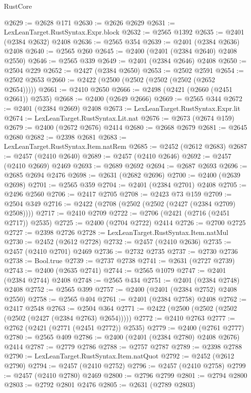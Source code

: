 \begin{lexlean}{RustCore}
\begin{coremodule}
@2629 := @2628 @171
@2630 := @2626 @2629
@2631 := LexLeanTarget.RustSyntax.Expr.block
@2632 := @2565 @1392
@2635 := @2401 (@2384 @2632) @2408
@2636 := @2565 @354
@2639 := @2401 (@2384 @2636) @2408
@2640 := @2565 @260
@2645 := @2400 (@2401 (@2384 @2640) @2408 @2550)
@2646 := @2565 @339
@2649 := @2401 (@2384 @2646) @2408
@2650 := @2504 @229
@2652 := @2427 (@2384 @2650)
@2653 := @2502 @2591
@2654 := @2502 @2653
@2660 := @2422 (@2500 (@2502 (@2502 (@2502 (@2652 @2654)))))
@2661 := @2410 @2650
@2666 := @2498 (@2421 (@2660 (@2451 @2661)) @2535)
@2668 := @2400 (@2649 @2666)
@2669 := @2565 @344
@2672 := @2401 (@2384 @2669) @2408
@2673 := LexLeanTarget.RustSyntax.Expr.lit
@2674 := LexLeanTarget.RustSyntax.Lit.nat
@2676 := @2673 (@2674 @159)
@2679 := @2400 (@2672 @2676) @2414
@2680 := @2668 @2679
@2681 := @2645 @2680
@2682 := @2398 @2681
@2683 := LexLeanTarget.RustSyntax.Item.natRem
@2685 := @2452 (@2612 @2683)
@2687 := @2457 (@2410 @2640)
@2689 := @2457 (@2410 @2646)
@2692 := @2457 (@2410 @2669) @2469
@2693 := @2689 @2692
@2694 := @2687 @2693
@2696 := @2685 @2694 @2476
@2698 := @2631 (@2682 @2696)
@2700 := @2400 (@2639 @2698)
@2701 := @2565 @359
@2704 := @2401 (@2384 @2701) @2408
@2705 := @2496 @2560
@2706 := @2417 @2705
@2708 := @2423 @73 @159
@2709 := @2504 @349
@2716 := @2422 (@2708 (@2502 (@2502 (@2427 (@2384 @2709) @2508))))
@2717 := @2410 @2709
@2722 := @2706 (@2421 (@2716 (@2451 @2717)) @2535)
@2725 := @2400 (@2704 @2722) @2414
@2726 := @2700 @2725
@2727 := @2398 @2726
@2728 := LexLeanTarget.RustSyntax.Item.natMul
@2730 := @2452 (@2612 @2728)
@2732 := @2457 (@2410 @2636)
@2735 := @2457 (@2410 @2701) @2469
@2736 := @2732 @2735
@2737 := @2730 @2736
@2738 := Bool.true
@2739 := @2737 @2738
@2741 := @2631 (@2727 @2739)
@2743 := @2400 (@2635 @2741)
@2744 := @2565 @1079
@2747 := @2401 (@2384 @2744) @2408
@2748 := @2565 @434
@2751 := @2401 (@2384 @2748) @2408
@2752 := @2565 @399
@2757 := @2400 (@2401 (@2384 @2752) @2408 @2550)
@2758 := @2565 @404
@2761 := @2401 (@2384 @2758) @2408
@2762 := @2417 @2548
@2763 := @2504 @364
@2771 := @2422 (@2500 (@2502 (@2502 (@2502 (@2427 (@2384 @2763) @2654)))))
@2772 := @2410 @2763
@2777 := @2762 (@2421 (@2771 (@2451 @2772)) @2535)
@2779 := @2400 (@2761 @2777)
@2780 := @2565 @409
@2786 := @2400 (@2401 (@2384 @2780) @2408 @2676) @2414
@2787 := @2779 @2786
@2788 := @2757 @2787
@2789 := @2398 @2788
@2790 := LexLeanTarget.RustSyntax.Item.natQuot
@2792 := @2452 (@2612 @2790)
@2794 := @2457 (@2410 @2752)
@2796 := @2457 (@2410 @2758)
@2799 := @2457 (@2410 @2780) @2469
@2800 := @2796 @2799
@2801 := @2794 @2800
@2803 := @2792 @2801 @2476
@2805 := @2631 (@2789 @2803)

\end{coremodule}
\end{lexlean}
